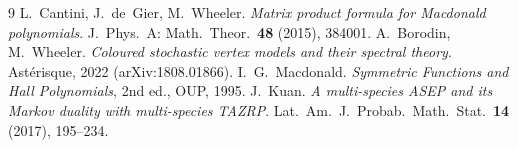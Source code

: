 \begin{thebibliography}{9}
 L.~Cantini, J.~de~Gier, M.~Wheeler.  \emph{Matrix product formula for Macdonald polynomials}.  J.\ Phys.\ A: Math.\ Theor.\ \textbf{48} (2015), 384001.
 A.~Borodin, M.~Wheeler.  \emph{Coloured stochastic vertex models and their spectral theory}.  Astérisque, 2022 (arXiv:1808.01866).
 I.~G.~Macdonald.  \emph{Symmetric Functions and Hall Polynomials}, 2nd ed., OUP, 1995.
 J.~Kuan.  \emph{A multi-species ASEP and its Markov duality with multi-species TAZRP}.  Lat.\ Am.\ J.\ Probab.\ Math.\ Stat.\ \textbf{14} (2017), 195--234.
\end{thebibliography}


